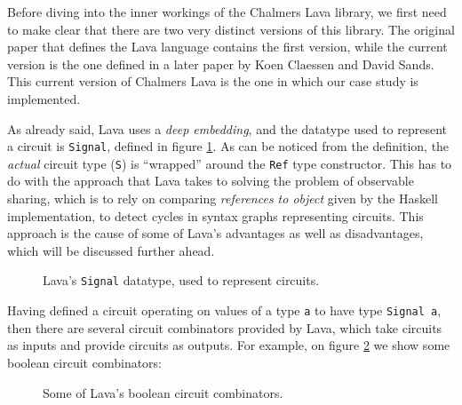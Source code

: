 \documentclass[a4paper]{article}
\begin{document}
            Before diving into the inner workings of the Chalmers Lava library, we first need to
            make clear that there are two very distinct versions of this library. The original paper
            that defines the Lava language\cite{lava1998} contains the first version, while the
            current version is the one defined in a later paper\cite{observable-sharing-1999} by
            Koen Claessen and David Sands. This current version of Chalmers Lava is the one in which
            our case study is implemented.

            As already said, Lava uses a \emph{deep embedding}, and the datatype used to represent a
            circuit is \texttt{Signal}, defined in figure \ref{fig:lava-signal}. As can be noticed
            from the definition, the \emph{actual} circuit type (\texttt{S}) is ``wrapped'' around
            the \texttt{Ref} type constructor. This has to do with the approach that Lava takes to
            solving the problem of observable sharing, which is to rely on comparing
            \emph{references to object} given by the Haskell implementation, to detect cycles in
            syntax graphs representing circuits. This approach is the cause of some of Lava's
            advantages as well as disadvantages, which will be discussed further ahead.

            \begin{figure}[h!]
                \begin{center}
                \end{center}
                \caption{Lava's \texttt{Signal} datatype, used to represent circuits.
                    \label{fig:lava-signal}}
            \end{figure}

            Having defined a circuit operating on values of a type \texttt{a} to have type
            \texttt{Signal a}, then there are several circuit combinators provided by Lava, which
            take circuits as inputs and provide circuits as outputs. For example, on figure
            \ref{fig:lava-boolean-combinators} we show some boolean circuit combinators:

            \begin{figure}[h!]
                \begin{center}
                \end{center}
                \caption{Some of Lava's boolean circuit combinators.
                    \label{fig:lava-boolean-combinators}}
            \end{figure}
\end{document}
